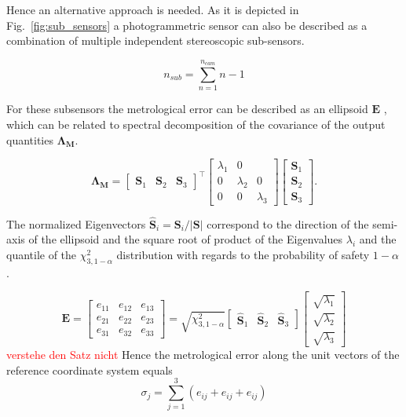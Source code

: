 \documentclass[5p,times,procedia]{elsarticle}
\begin{document}
Hence an alternative approach is needed. As it is depicted in  Fig.~\ref{fig:sub_sensors} a photogrammetric sensor can also be described as a combination of multiple independent stereoscopic sub-sensors.

\begin{equation}
	\label{eqn:CovarianceMatrix}
	n_{sub} = \sum_{n=1}^{n_{cam}}n-1
\end{equation}

For these subsensors the metrological error can be described as an ellipsoid $\mathbf{E}$ \cite{Luhmann2003}, which can be related to spectral decomposition of the covariance of the output quantities $\mathbf{\Lambda_{M}}$.

\begin{equation}
	\mathbf{\Lambda_{M}} =
	\begin{bmatrix}
		\mathbf{S}_1^{} & \mathbf{S}_2^{} & \mathbf{S}_3^{}
	\end{bmatrix}^{\top}
	\begin{bmatrix}
		\lambda_1^{} & 0 \\
		0 & \lambda_2^{} &  0 \\
		0 & 0 &  \lambda_3^{}
	\end{bmatrix}
	\begin{bmatrix}
		\mathbf{S}_1^{} \\
		\mathbf{S}_2^{} \\
		\mathbf{S}_3^{}
	\end{bmatrix}.
\end{equation}

The normalized Eigenvectors $\mathbf{\hat{S}}_i = \mathbf{S}_i / |\mathbf{S}|$ correspond to the direction of the semi-axis of the ellipsoid and the square root of product of the Eigenvalues $\lambda_i$ and the quantile of the $\chi^2_{3,1-\alpha} $ distribution with regards to the probability of safety $1-\alpha$ \cite{Pelzer1995}.

\begin{equation}
	\mathbf{E} =
	\begin{bmatrix}
		e_{11}^{} & e_{12}^{} & e_{13}^{} \\
		e_{21}^{} & e_{22}^{} & e_{23}^{} \\
		e_{31}^{} & e_{32}^{} & e_{33}^{}
	\end{bmatrix}
	=
	\sqrt{ \chi^2_{3,1-\alpha}}
	\begin{bmatrix}
		\mathbf{\hat{S}}_1^{} & \mathbf{\hat{S}}_2^{} & \mathbf{\hat{S}}_3^{}
	\end{bmatrix}
	\begin{bmatrix}
		\sqrt{\lambda_1^{}} \\
		\sqrt{\lambda_2^{}} \\
		\sqrt{\lambda_3^{}}
	\end{bmatrix}
\end{equation}
\textcolor{red}{verstehe den Satz nicht}
Hence the metrological error along the unit vectors of the reference coordinate system equals
\begin{equation}
	\sigma_j = \sum_{j=1}^{3} \left( e_{ij} + e_{ij} + e_{ij}\right)
\end{equation}
\end{document}
